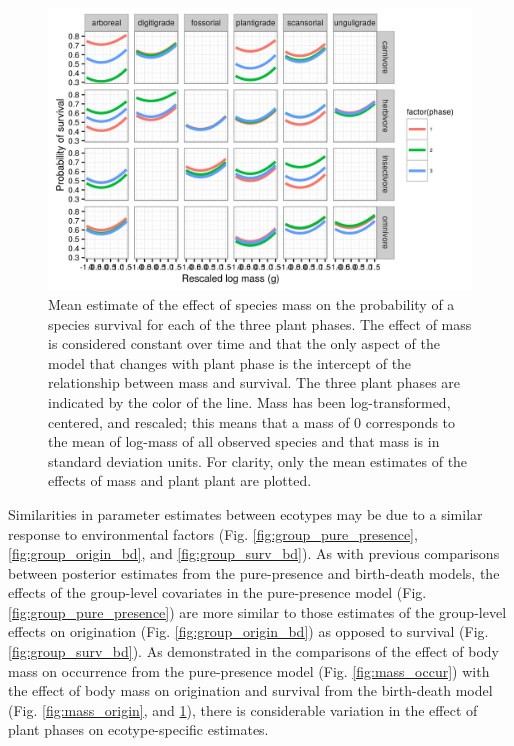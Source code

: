 \documentclass[12pt,letterpaper]{article}
\begin{document}
\begin{figure}[ht]
  \centering
  \includegraphics[width=\textwidth,height=0.4\textheight,keepaspectratio=true]{figure/mass_on_surv_bd}
  \caption[Effect of mass on probability of species survival as estimated from the birth-death model]{Mean estimate of the effect of species mass on the probability of a species survival for each of the three plant phases. The effect of mass is considered constant over time and that the only aspect of the model that changes with plant phase is the intercept of the relationship between mass and survival. The three plant phases are indicated by the color of the line. Mass has been log-transformed, centered, and rescaled; this means that a mass of 0 corresponds to the mean of log-mass of all observed species and that mass is in standard deviation units. For clarity, only the mean estimates of the effects of mass and plant plant are plotted.}
  \label{fig:mass_survival}
\end{figure}



Similarities in parameter estimates between ecotypes may be due to a similar response to environmental factors (Fig. \ref{fig:group_pure_presence}, \ref{fig:group_origin_bd}, and \ref{fig:group_surv_bd}). As with previous comparisons between posterior estimates from the pure-presence and birth-death models, the effects of the group-level covariates in the pure-presence model (Fig. \ref{fig:group_pure_presence})  are more similar to those estimates of the group-level effects on origination (Fig. \ref{fig:group_origin_bd}) as opposed to survival (Fig. \ref{fig:group_surv_bd}). As demonstrated in the comparisons of the effect of body mass on occurrence from the pure-presence model (Fig. \ref{fig:mass_occur}) with the effect of body mass on origination and survival from the birth-death model (Fig. \ref{fig:mass_origin}, and \ref{fig:mass_survival}), there is considerable variation in the effect of plant phases on ecotype-specific estimates.
\end{document}

